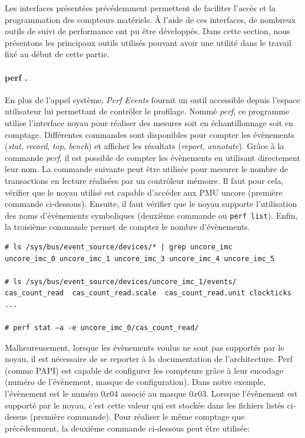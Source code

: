         Les interfaces présentées précédemment permettent de faciliter l'accès et la programmation des compteurs matériels. À l'aide de ces interfaces, de nombreux outils de suivi de performance ont pu être développés. Dans cette section, nous présentons les principaux outils utilisés pouvant avoir une utilité dans le travail fixé au début de cette partie.

        \paragraph{perf \cite{Weaver2013}.} 
            
            En plus de l'appel système, \textit{Perf Events} fournit un outil accessible depuis l'espace utilisateur lui permettant de contrôler le profilage. Nommé \textit{perf}, ce programme utilise l'interface noyau pour réaliser des mesures soit en échantillonnage soit en comptage. Différentes commandes sont disponibles pour compter les évènements (\textit{stat}, \textit{record}, \textit{top}, \textit{bench}) et afficher les résultats (\textit{report}, \textit{annotate}). Grâce à la commande \textit{perf}, il est possible de compter les évènements en utilisant directement leur nom. La commande suivante peut être utilisée pour mesurer le nombre de transactions en lecture réalisées par un contrôleur mémoire. Il faut pour cela, vérifier que le noyau utilisé est capable d'accéder aux PMU uncore (première commande ci-dessous). Ensuite, il faut vérifier que le noyau supporte l'utilisation des noms d'évènements symboliques (deuxième commande ou \verb|perf list|). Enfin, la troisième commande permet de compter le nombre d'évènements.
            
\begin{verbatim}
# ls /sys/bus/event_source/devices/* | grep uncore_imc
uncore_imc_0 uncore_imc_1 uncore_imc_3 uncore_imc_4 uncore_imc_5

# ls /sys/bus/event_source/devices/uncore_imc_1/events/
cas_count_read  cas_count_read.scale  cas_count_read.unit clockticks ...         

# perf stat –a -e uncore_imc_0/cas_count_read/
\end{verbatim}
            
            Malheureusement, lorsque les évènements voulus ne sont pas supportés par le noyau, il est nécessaire de se reporter à la documentation de l'architecture. Perf (comme PAPI) est capable de configurer les compteurs grâce à leur encodage (numéro de l'évènement, masque de configuration). Dans notre exemple, l'évènement est le numéro $0x04$ associé au masque $0x03$. Lorsque l'évènement est supporté par le noyau, c'est cette valeur qui est stockée dans les fichiers listés ci-dessus (première commande). Pour réaliser le même comptage que précédemment, la deuxième commande ci-dessous peut être utilisée:

